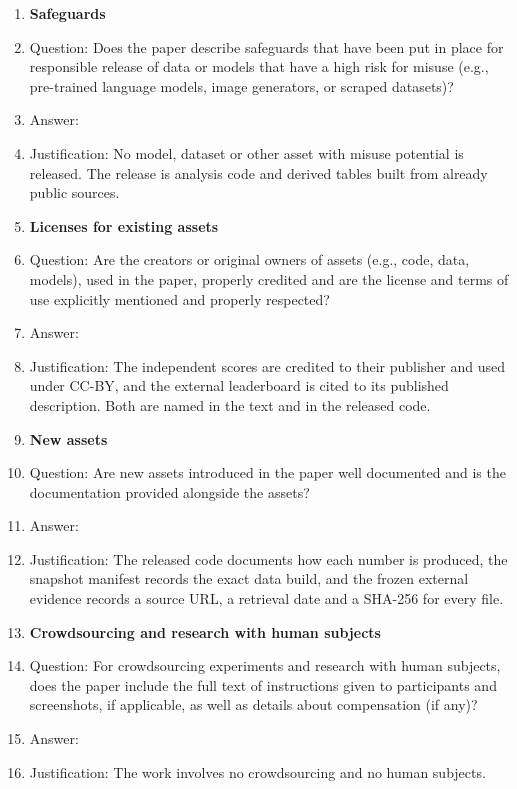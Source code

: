 \documentclass{article}
\begin{document}
\begin{enumerate}
\item {\bf Safeguards}
    \item[] Question: Does the paper describe safeguards that have been put in place for responsible release of data or models that have a high risk for misuse (e.g., pre-trained language models, image generators, or scraped datasets)?
    \item[] Answer: \answerNA{}
    \item[] Justification: No model, dataset or other asset with misuse potential is released. The release is analysis code and derived tables built from already public sources.


\item {\bf Licenses for existing assets}
    \item[] Question: Are the creators or original owners of assets (e.g., code, data, models), used in the paper, properly credited and are the license and terms of use explicitly mentioned and properly respected?
    \item[] Answer: \answerYes{}
    \item[] Justification: The independent scores are credited to their publisher and used under CC-BY, and the external leaderboard is cited to its published description. Both are named in the text and in the released code.


\item {\bf New assets}
    \item[] Question: Are new assets introduced in the paper well documented and is the documentation provided alongside the assets?
    \item[] Answer: \answerYes{}
    \item[] Justification: The released code documents how each number is produced, the snapshot manifest records the exact data build, and the frozen external evidence records a source URL, a retrieval date and a SHA-256 for every file.


\item {\bf Crowdsourcing and research with human subjects}
    \item[] Question: For crowdsourcing experiments and research with human subjects, does the paper include the full text of instructions given to participants and screenshots, if applicable, as well as details about compensation (if any)?
    \item[] Answer: \answerNA{}
    \item[] Justification: The work involves no crowdsourcing and no human subjects.



\end{enumerate}
\end{document}
